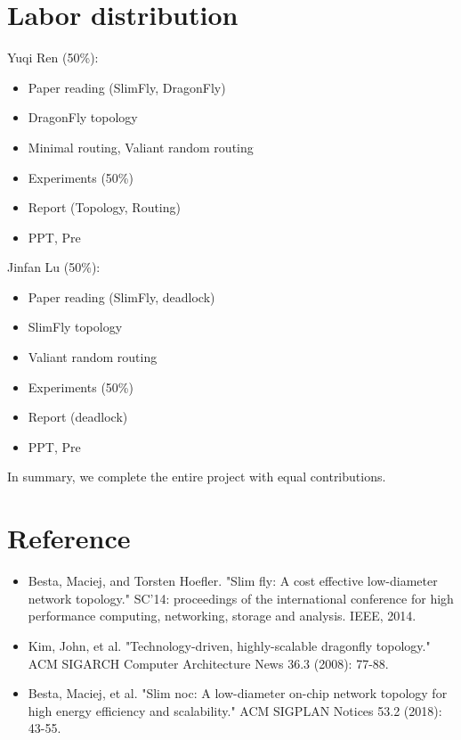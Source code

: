 \documentclass[utf8]{article}
\begin{document}
\section{Labor distribution}
Yuqi Ren (50\%):
\begin{itemize}
    \item Paper reading (SlimFly, DragonFly)
    \item DragonFly topology
    \item Minimal routing, Valiant random routing
    \item Experiments (50\%)
    \item Report (Topology, Routing)
    \item PPT, Pre
\end{itemize}
Jinfan Lu (50\%):
\begin{itemize}
    \item Paper reading (SlimFly, deadlock)
    \item SlimFly topology
    \item Valiant random routing
    \item Experiments (50\%)
    \item Report (deadlock)
    \item PPT, Pre
\end{itemize}
In summary, we complete the entire project with equal contributions.

\section{Reference}
\begin{itemize}
    \item Besta, Maciej, and Torsten Hoefler. "Slim fly: A cost effective low-diameter network topology." SC'14: proceedings of the international conference for high performance computing, networking, storage and analysis. IEEE, 2014.
    \item Kim, John, et al. "Technology-driven, highly-scalable dragonfly topology." ACM SIGARCH Computer Architecture News 36.3 (2008): 77-88.
    \item Besta, Maciej, et al. "Slim noc: A low-diameter on-chip network topology for high energy efficiency and scalability." ACM SIGPLAN Notices 53.2 (2018): 43-55.
\end{itemize}
\end{document}
